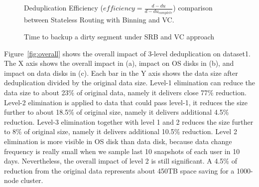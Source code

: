 \begin{figure}[ht]
  \centering
    \caption{Deduplication Efficiency
        ($efficiency=\frac{d-du}{d-du_{complete}}$) comparison between
    Stateless Routing with Binning and VC.}
  \label{fig-exbin-efficiency-graph}
\end{figure}

\begin{figure}[htbp]
  \centering
  \caption{Time to backup a dirty segment under SRB and VC approach}
  \label{fig:srb_vs_vc}
\end{figure}


Figure~\ref{fig:overall} shows the overall impact of 3-level deduplication on dataset1.
The X axis shows the overall impact in (a),  impact on OS disks in (b), and impact on data disks in (c).
Each bar in the Y axis shows the data size after deduplication divided by the original data size.
Level-1 elimination can reduce the data size to about 23\% of original data, namely it delivers close 77\% reduction.
Level-2 elimination is applied to data that could pass level-1, it
reduces the size further to about 18.5\% of original size, namely it delivers additional 4.5\% reduction.
Level-3 elimination together with level 1 and 2
reduces the size further to 8\% of original size, namely it delivers additional 10.5\% reduction.
Level 2 elimination is more visible in OS disk than data disk, because data change frequency is really small
when we sample last 10 snapshots of each user in 10 days. Nevertheless, the overall impact of level 2 is still significant.
A 4.5\% of reduction from the original data represents about 450TB space saving for a 1000-node cluster.


